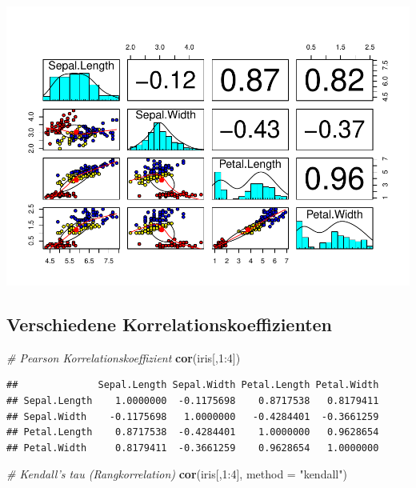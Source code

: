 \documentclass[]{article}
\newenvironment{Shaded}{\begin{snugshade}}{\end{snugshade}}
\newcommand{\KeywordTok}[1]{\textcolor[rgb]{0.13,0.29,0.53}{\textbf{{#1}}}}
\newcommand{\DataTypeTok}[1]{\textcolor[rgb]{0.13,0.29,0.53}{{#1}}}
\newcommand{\DecValTok}[1]{\textcolor[rgb]{0.00,0.00,0.81}{{#1}}}
\newcommand{\StringTok}[1]{\textcolor[rgb]{0.31,0.60,0.02}{{#1}}}
\newcommand{\CommentTok}[1]{\textcolor[rgb]{0.56,0.35,0.01}{\textit{{#1}}}}
\newcommand{\NormalTok}[1]{{#1}}
\begin{document}
\includegraphics{Intro_Datenanalyse1_files/figure-latex/unnamed-chunk-163-1.pdf}

\subsection{Verschiedene
Korrelationskoeffizienten}\label{verschiedene-korrelationskoeffizienten}

\begin{Shaded}
\begin{Highlighting}[]
\CommentTok{# Pearson Korrelationskoeffizient}
\KeywordTok{cor}\NormalTok{(iris[,}\DecValTok{1}\NormalTok{:}\DecValTok{4}\NormalTok{]) }
\end{Highlighting}
\end{Shaded}

\begin{verbatim}
##              Sepal.Length Sepal.Width Petal.Length Petal.Width
## Sepal.Length    1.0000000  -0.1175698    0.8717538   0.8179411
## Sepal.Width    -0.1175698   1.0000000   -0.4284401  -0.3661259
## Petal.Length    0.8717538  -0.4284401    1.0000000   0.9628654
## Petal.Width     0.8179411  -0.3661259    0.9628654   1.0000000
\end{verbatim}

\begin{Shaded}
\begin{Highlighting}[]
\CommentTok{# Kendall's tau (Rangkorrelation)}
\KeywordTok{cor}\NormalTok{(iris[,}\DecValTok{1}\NormalTok{:}\DecValTok{4}\NormalTok{], }\DataTypeTok{method =} \StringTok{"kendall"}\NormalTok{) }
\end{Highlighting}
\end{Shaded}
\end{document}
